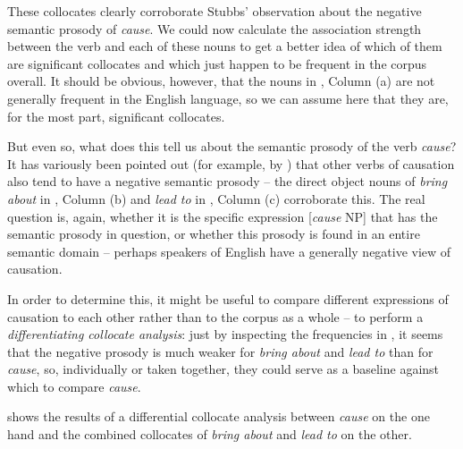 These collocates  clearly corroborate Stubbs' observation about the negative semantic  prosody of \textit{cause}. We could now calculate the association  strength between the verb  and each of these nouns  to get a better idea of which of them are significant collocates  and which just happen to be frequent in the corpus overall. It should be obvious, however, that the nouns in , Column (a) are not generally frequent in the English language, so we can assume here that they are, for the most part, significant collocates.

But even so, what does this tell us about the semantic prosody of the verb  \textit{cause}? It has variously been pointed out (for example, by \citealt{louw_semantic_2010}) that other verbs of causation also tend to have a negative semantic prosody -- the direct object nouns  of \textit{bring about} in , Column (b) and \textit{lead to} in , Column (c) corroborate this. The real question is, again, whether it is the specific expression [\textit{cause} NP] that has the semantic  prosody in question, or whether this prosody is found in an entire semantic domain -- perhaps speakers of English have a generally negative view of causation.

In order to determine this, it might be useful to compare different expressions of causation to each other rather than to the corpus as a whole -- to perform a \textit{differentiating collocate analysis}:  just by inspecting the frequencies in , it seems that the negative prosody is much weaker for \textit{bring about} and \textit{lead to} than for \textit{cause}, so, individually or taken together, they could serve as a baseline against which to compare \textit{cause}.

 shows the results of a differential collocate  analysis between \textit{cause} on the one hand and the combined collocates of \textit{bring about} and \textit{lead to} on the other.

